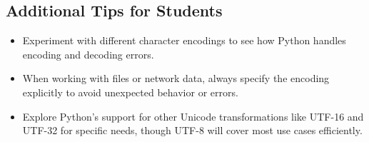 \documentclass{article}
\begin{document}
\subsection{Additional Tips for Students}
\begin{itemize}
    \item Experiment with different character encodings to see how Python handles encoding and decoding errors.
    \item When working with files or network data, always specify the encoding explicitly to avoid unexpected behavior or errors.
    \item Explore Python's support for other Unicode transformations like UTF-16 and UTF-32 for specific needs, though UTF-8 will cover most use cases efficiently.
\end{itemize}
\end{document}
